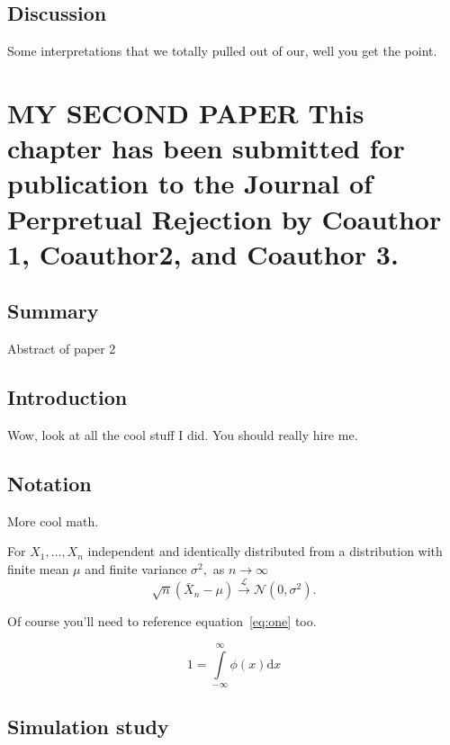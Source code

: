 \documentclass[english]{ucdenver-dissertation}
\makeatletter
\let\SF@@footnote\footnote
\def\footnote{\ifx\protect\@typeset@protect
    \expandafter\SF@@footnote
  \else
    \expandafter\SF@gobble@opt
  \fi
}
\edef\SF@gobble@opt{\noexpand\protect
  \expandafter\noexpand\csname SF@gobble@opt \endcsname}
\makeatother
\begin{document}
\section{Discussion}

Some interpretations that we totally pulled out of our, well you get the point.

\Blindtext

\newpage

\chapter{MY SECOND PAPER%
\footnote{This chapter has been submitted for publication to the Journal of Perpretual Rejection
by Coauthor 1, Coauthor2, and Coauthor 3.%
}\label{chap:paper2}}


\section{Summary}

Abstract of paper 2 \blindtext


\section{Introduction}

Wow, look at all the cool stuff I did.  You should really hire me.

\lipsum[2]


\section{Notation}

More cool math. 


For $X_1, \ldots, X_n$ independent and identically distributed
from a distribution with finite mean $\mu$ and finite variance $\sigma^2,$ as $n
\rightarrow \infty$ \[ \sqrt{n} \left( \bar{X}_n - \mu \right)
\stackrel{\mathcal{L}}{\rightarrow} \mathcal{N} \left(0, \sigma^2 \right).\]

Of course you'll need to reference equation~\eqref{eq:one} too.

\begin{equation}
  1 = \int\limits_{-\infty}^{\infty} \phi \left(x \right) \mathrm{d}x 
  \label{eq:one}
\end{equation}


\section{Simulation study}
\end{document}
